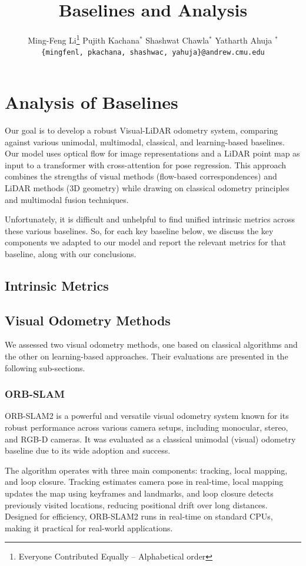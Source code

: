 \documentclass[11pt,a4paper]{article}
\title{Baselines and Analysis}
\author{
  Ming-Feng Li\thanks{\hspace{4pt}Everyone Contributed Equally -- Alphabetical order} \hspace{2em} Pujith Kachana$^*$ \hspace{2em} Shashwat Chawla$^*$ \hspace{2em} Yatharth Ahuja $^*$ \\
  \texttt{\{mingfenl, pkachana, shashwac, yahuja\}@andrew.cmu.edu}
  }
\date{}
\begin{document}
\maketitle

\section{Analysis of Baselines}

Our goal is to develop a robust Visual-LiDAR odometry system, comparing against various unimodal, multimodal, classical, and learning-based baselines. Our model uses optical flow for image representations and a LiDAR point map as input to a transformer with cross-attention for pose regression. This approach combines the strengths of visual methods (flow-based correspondences) and LiDAR methods (3D geometry) while drawing on classical odometry principles and multimodal fusion techniques.

Unfortunately, it is difficult and unhelpful to find unified intrinsic metrics across these various baselines. So, for each key baseline below, we discuss the key components we adapted to our model and report the relevant metrics for that baseline, along with our conclusions.

\subsection{Intrinsic Metrics}

\subsection{Visual Odometry Methods}

We assessed two visual odometry methods, one based on classical algorithms and the other on learning-based approaches. Their evaluations are presented in the following sub-sections.
\subsubsection{ORB-SLAM}
ORB-SLAM2 \cite{orb-slam2} is a powerful and versatile visual odometry system known for its robust performance across various camera setups, including monocular, stereo, and RGB-D cameras. It was evaluated as a classical unimodal (visual) odometry baseline due to its wide adoption and success.

The algorithm operates with three main components: tracking, local mapping, and loop closure. Tracking estimates camera pose in real-time, local mapping updates the map using keyframes and landmarks, and loop closure detects previously visited locations, reducing positional drift over long distances. Designed for efficiency, ORB-SLAM2 runs in real-time on standard CPUs, making it practical for real-world applications.
\end{document}

